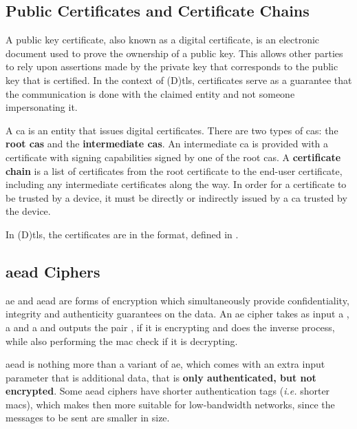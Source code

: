 \documentclass{llncs}
\begin{document}
\subsection{Public Certificates and Certificate Chains} \label{pccc}

A public key certificate, also known as a digital certificate, is an electronic
document used to prove the ownership of a public key. This allows other parties
to rely upon assertions made by the private key that corresponds to the public key
that is certified. In the context of (D)\gls{tls}, certificates serve as a guarantee
that the communication is done with the claimed entity and not someone impersonating it.

A \gls{ca} is an entity that issues digital certificates. There are two types of
\gls{ca}s: the \textbf{root \gls{ca}s} and the \textbf{intermediate \gls{ca}s}.
An intermediate \gls{ca} is provided with a certificate with signing capabilities
signed by one of the root \gls{ca}s. A \textbf{certificate chain} is a list of
certificates from the root certificate to the end-user certificate, including
any intermediate certificates along the way. In order for a certificate
to be trusted by a device, it must be directly or indirectly issued by a \gls{ca} trusted by the device.

In (D)\gls{tls}, the certificates are in the  format, defined
in \cite{rfc5280}.

\subsection{\gls{aead} Ciphers} \label{aeadciphers}

\gls{ae} and \gls{aead} are forms of encryption which simultaneously provide
confidentiality, integrity and authenticity guarantees on the data. An \gls{ae}
cipher takes as input a , a  and a 
and outputs the pair , if it is encrypting and does the inverse
process, while also performing the \gls{mac} check if it is decrypting.

\gls{aead} is nothing more than a variant of \gls{ae}, which comes with an extra
input parameter that is additional data, that is \textbf{only authenticated, but not encrypted}.
Some \gls{aead} ciphers have shorter authentication tags (\textit{i.e.} shorter \gls{mac}s),
which makes then more suitable for low-bandwidth networks, since the messages to be sent are smaller in size.
\end{document}
